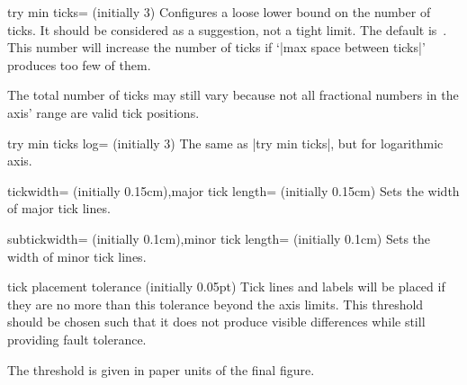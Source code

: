 \begin{pgfplotskey}{try min ticks= (initially 3)}
	Configures a loose lower bound on the number of ticks. It should be considered as a suggestion, not a tight limit. The default is~\axisdefaulttryminticks. This number will increase the number of ticks if `|max space between ticks|' produces too few of them.

	The total number of ticks may still vary because not all fractional numbers in the axis' range are valid tick positions.
\end{pgfplotskey}

\begin{pgfplotskey}{try min ticks log= (initially 3)}
	The same as |try min ticks|, but for logarithmic axis.
\end{pgfplotskey}

\begin{pgfplotskeylist}{tickwidth= (initially 0.15cm),major tick length= (initially 0.15cm)}
	Sets the width of major tick lines.
\end{pgfplotskeylist}

\begin{pgfplotskeylist}{subtickwidth= (initially 0.1cm),minor tick length= (initially 0.1cm)}
	Sets the width of minor tick lines.
\end{pgfplotskeylist}

\begin{pgfplotsxykeylist}{\x tick placement tolerance (initially 0.05pt)}
	Tick lines and labels will be placed if they are no more than this tolerance beyond the axis limits. This threshold should be chosen such that it does not produce visible differences while still providing fault tolerance.

	The threshold is given in paper units of the final figure.
\end{pgfplotsxykeylist}

